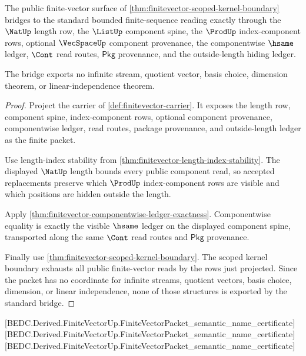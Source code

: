 \begin{theorem}
\label{thm:finitevector-standard-schema-bridge-boundary}
The public finite-vector surface of
\autoref{thm:finitevector-scoped-kernel-boundary} bridges to the standard
bounded finite-sequence reading exactly through the $\NatUp$ length row, the
$\ListUp$ component spine, the $\ProdUp$ index-component rows, optional
$\VecSpaceUp$ component provenance, the componentwise $\hsame$ ledger, $\Cont$
read routes, $\mathsf{Pkg}$ provenance, and the outside-length hiding ledger.

The bridge exports no infinite stream, quotient vector, basis choice,
dimension theorem, or linear-independence theorem.
\end{theorem}
\begin{proof}
Project the carrier of \autoref{def:finitevector-carrier}. It exposes the
length row, component spine, index-component rows, optional component
provenance, componentwise ledger, read routes, package provenance, and
outside-length ledger as the finite packet.

Use length-index stability from
\autoref{thm:finitevector-length-index-stability}. The displayed $\NatUp$
length bounds every public component read, so accepted replacements preserve
which $\ProdUp$ index-component rows are visible and which positions are hidden
outside the length.

Apply \autoref{thm:finitevector-componentwise-ledger-exactness}. Componentwise
equality is exactly the visible $\hsame$ ledger on the displayed component
spine, transported along the same $\Cont$ read routes and $\mathsf{Pkg}$
provenance.

Finally use \autoref{thm:finitevector-scoped-kernel-boundary}. The scoped
kernel boundary exhausts all public finite-vector reads by the rows just
projected. Since the packet has no coordinate for infinite streams, quotient
vectors, basis choice, dimension, or linear independence, none of those
structures is exported by the standard bridge.
\end{proof}

[BEDC.Derived.FiniteVectorUp.FiniteVectorPacket\_semantic\_name\_certificate]
[BEDC.Derived.FiniteVectorUp.FiniteVectorPacket\_semantic\_name\_certificate]
[BEDC.Derived.FiniteVectorUp.FiniteVectorPacket\_semantic\_name\_certificate]

